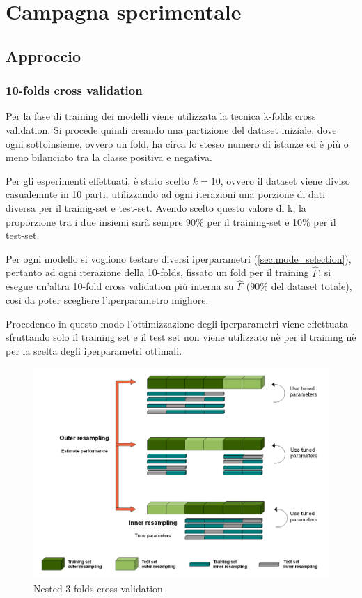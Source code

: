 \chapter{Campagna sperimentale}

\section{Approccio}
\subsection{10-folds cross validation}
Per la fase di training dei modelli viene utilizzata la tecnica k-folds cross validation. Si procede quindi creando una partizione del dataset iniziale, dove ogni sottoinsieme, ovvero un fold, ha circa lo stesso numero di istanze ed è più o meno bilanciato tra la classe positiva e negativa.

Per gli esperimenti effettuati, è stato scelto $k = 10$, ovvero il dataset viene diviso casualemnte in 10 parti, utilizzando ad ogni iterazioni una porzione di dati diversa per il trainig-set e test-set. Avendo scelto questo valore di k, la proporzione tra i due insiemi sarà sempre 90\% per il training-set e 10\% per il test-set.

Per ogni modello si vogliono testare diversi iperparametri (\autoref{sec:mode_selection}), pertanto ad ogni iterazione della 10-folds, fissato un fold per il training $\hat{F}$, si esegue un'altra 10-fold cross validation più interna su $\hat{F}$  ($90\%$ del dataset totale), così da poter scegliere l'iperparametro migliore.

Procedendo in questo modo l'ottimizzazione degli iperparametri viene effettuata sfruttando solo il training set e il test set non viene utilizzato nè per il training nè per la scelta degli iperparametri ottimali.

\begin{figure}[H]
	\centering
	\includegraphics[width=13cm]{assets/nested-cv.png}
	\caption{Nested 3-folds cross validation.}
\end{figure}

